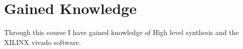 \chapter{Gained Knowledge}
Through this course I have gained knowledge of High level synthesis and the XILINX vivado software.